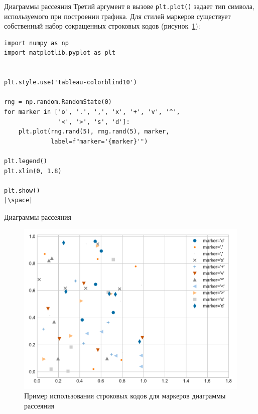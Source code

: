 \documentclass[aspectratio=169, mathserif]{beamer}	%
\begin{document}
\begin{frame}[fragile, label=m]{Диаграммы рассеяния}
\scriptsize
Третий аргумент в вызове \texttt{plt.plot()} задает тип символа, используемого при построении графика. Для стилей маркеров существует собственный набор сокращенных строковых кодов (рисунок~\ref{fig:fig_14}):
\vfill
\begin{verbatim}
import numpy as np
import matplotlib.pyplot as plt


plt.style.use('tableau-colorblind10')

rng = np.random.RandomState(0)
for marker in ['o', '.', ',', 'x', '+', 'v', '^',
               '<', '>', 's', 'd']:
    plt.plot(rng.rand(5), rng.rand(5), marker,
             label=f"marker='{marker}'")

plt.legend()
plt.xlim(0, 1.8)

plt.show()
|\space|
\end{verbatim}
\vfill
\end{frame}

\begin{frame}[fragile, label=m]{Диаграммы рассеяния}
\scriptsize
\begin{figure}[h!]
	\centering
	\includegraphics[width=.69\linewidth]{./pics/Figure_14}
	\caption{Пример использования строковых кодов для маркеров диаграммы рассеяния}
	\label{fig:fig_14}
\end{figure}
\vfill
\end{frame}
\end{document}

